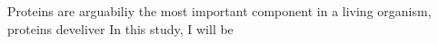 Proteins are arguabiliy the most important component in a living organism, proteins develiver  In this study, I will be 
